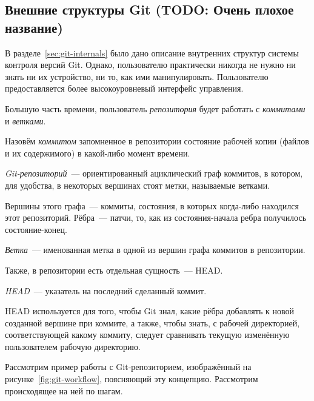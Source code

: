 \subsection{Внешние структуры Git (TODO: Очень плохое название)}

В разделе~\ref{sec:git-internals} было дано описание внутренних
структур системы контроля версий Git. Однако, пользователю практически
никогда не нужно ни знать ни их устройство, ни то, как ими
манипулировать. Пользователю предоставляется более высокоуровневый
интерфейс управления. 

Большую часть времени, пользователь \emph{репозитория} будет работать
с \emph{коммитами} и \emph{ветками}.

\begin{definition}[Коммит]
  Назовём \emph{коммитом} запомненное в репозитории состояние рабочей
  копии (файлов и их содержимого) в какой-либо момент времени.
\end{definition}

\begin{definition}
  \emph{Git-репозиторий}~--- ориентированный ациклический граф
  коммитов, в котором, для удобства, в некоторых вершинах стоят метки,
  называемые ветками.
  
  Вершины этого графа~--- коммиты, состояния, в которых когда-либо
  находился этот репозиторий. Рёбра~--- патчи, то, как из
  состояния-начала ребра получилось состояние-конец.
\end{definition}

\begin{definition}[Ветка]
  \emph{Ветка}~--- именованная метка в одной из вершин графа коммитов
  в репозитории.
\end{definition}

Также, в репозитории есть отдельная сущность~--- HEAD. 

\begin{definition}[HEAD]
  \emph{HEAD}~--- указатель на последний сделанный коммит.
\end{definition}

HEAD используется для того, чтобы Git знал, какие рёбра добавлять к
новой созданной вершине при коммите, а также, чтобы знать, с рабочей
директорией, соответствующей какому коммиту, следует сравнивать
текущую изменённую пользователем рабочую директорию. 

Рассмотрим пример работы с Git-репозиторием, изображённый на
рисунке~\ref{fig:git-workflow}, поясняющий эту концепцию. Рассмотрим
происходящее на ней по шагам.

